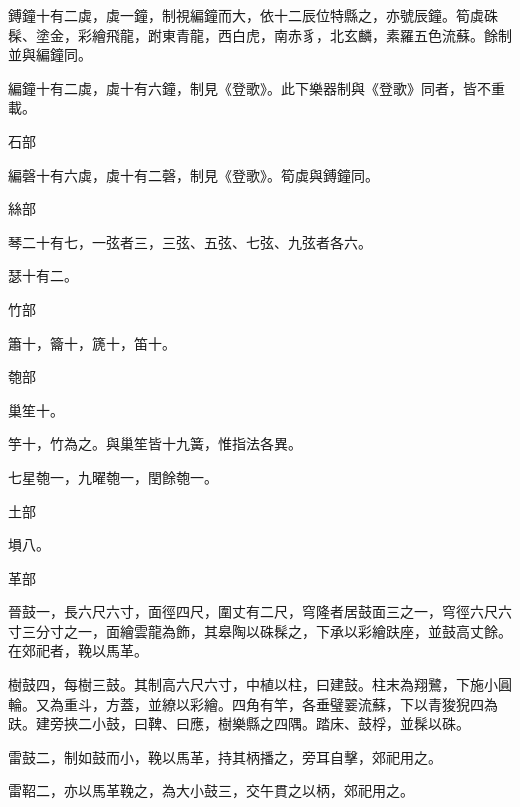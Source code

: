 \begin{pinyinscope}
 鎛鐘十有二虡，虡一鐘，制視編鐘而大，依十二辰位特縣之，亦號辰鐘。筍虡硃髹、塗金，彩繪飛龍，跗東青龍，西白虎，南赤豸，北玄麟，素羅五色流蘇。餘制並與編鐘同。



 編鐘十有二虡，虡十有六鐘，制見《登歌》。此下樂器制與《登歌》同者，皆不重載。



 石部



 編磬十有六虡，虡十有二磬，制見《登歌》。筍虡與鎛鐘同。



 絲部



 琴二十有七，一弦者三，三弦、五弦、七弦、九弦者各六。



 瑟十有二。



 竹部



 簫十，籥十，篪十，笛十。



 匏部



 巢笙十。



 竽十，竹為之。與巢笙皆十九簧，惟指法各異。



 七星匏一，九曜匏一，閏餘匏一。



 土部



 塤八。



 革部



 晉鼓一，長六尺六寸，面徑四尺，圍丈有二尺，穹隆者居鼓面三之一，穹徑六尺六寸三分寸之一，面繪雲龍為飾，其皋陶以硃髹之，下承以彩繪趺座，並鼓高丈餘。在郊祀者，鞔以馬革。



 樹鼓四，每樹三鼓。其制高六尺六寸，中植以柱，曰建鼓。柱末為翔鷺，下施小圓輪。又為重斗，方蓋，並繚以彩繪。四角有竿，各垂璧翣流蘇，下以青狻猊四為趺。建旁挾二小鼓，曰鞞、曰應，樹樂縣之四隅。踏床、鼓桴，並髹以硃。



 雷鼓二，制如鼓而小，鞔以馬革，持其柄播之，旁耳自擊，郊祀用之。



 雷鞀二，亦以馬革鞔之，為大小鼓三，交午貫之以柄，郊祀用之。




\end{pinyinscope}
